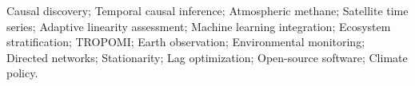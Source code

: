 \acresetall
\noindent Causal discovery; Temporal causal inference; Atmospheric methane; Satellite time series; Adaptive linearity assessment; Machine learning integration; Ecosystem stratification; TROPOMI; Earth observation; Environmental monitoring; Directed networks; Stationarity; Lag optimization; Open-source software; Climate policy.

